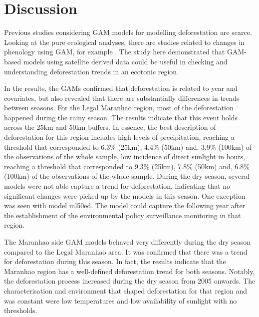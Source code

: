 \section{Discussion} \label{ref:discussion}

Previous studies considering GAM models for modelling deforestation are scarce. Looking at the pure ecological analyses, there are studies related to changes in phenology using GAM, for example \citet{TAPIA_2017}. The study here demonstrated that GAM-based models using satellite derived data could be useful in checking and understanding deforestation trends in an ecotonic region. 


In the results, the GAMs confirmed that deforestation is related to year and covariates, but also revealed that there are substantially differences in trends between seasons. For the Legal Maranhao region, most of the deforestation happened during the rainy season. The results indicate that this event holds across the 25km and 50km buffers. In essence, the best description of deforestation for this region includes high levels of precipitation, reaching a threshold that corresponded to 6.3\% (25km), 4.4\% (50km) and, 3.9\% (100km) of the observations of the whole sample, low incidence of direct sunlight in hours, reaching a threshold that corresponded to 9.3\% (25km), 7.8\% (50km) and, 6.8\% (100km) of the observations of the whole sample. During the dry season, several models were not able capture a trend for deforestation, indicating that no significant changes were picked up by the models in this season. One exception was seen with model ml50ed. The model could capture the following year after the establishment of the environmental policy surveillance monitoring in that region.

The Maranhao side GAM models behaved very differently during the dry season compared to the Legal Maranhao area. It was confirmed that there was a trend for deforestation during this season. In fact, the results indicate that the Maranhao region has a well-defined deforestation trend for both seasons. Notably, the deforestation process increased during the dry season from 2005 onwards. The characterisation and environment that shaped deforestation for that region and was constant were low temperatures and low availability of sunlight with no thresholds. 

